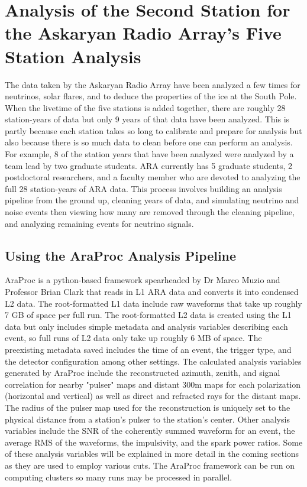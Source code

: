 \chapter{Analysis of the Second Station for the Askaryan Radio Array's Five Station Analysis}

  The data taken by the Askaryan Radio Array have been analyzed a few times for neutrinos, solar flares, and to deduce the properties of the ice at the South Pole. 
  When the livetime of the five stations is added together, there are roughly 28 station-years of data but only 9 years of that data have been analyzed.
  This is partly because each station takes so long to calibrate and prepare for analysis but also because there is so much data to clean before one can perform an analysis. 
  For example, 8 of the station years that have been analyzed were analyzed by a team lead by two graduate students. 
  ARA currently has 5 graduate students, 2 postdoctoral researchers, and a faculty member who are devoted to analyzing the full 28 station-years of ARA data. 
  This process involves building an analysis pipeline from the ground up, cleaning years of data, and simulating neutrino and noise events then viewing how many are removed through the cleaning pipeline, and analyzing remaining events for neutrino signals. 
  
\section{Using the AraProc Analysis Pipeline}

  AraProc is a python-based framework spearheaded by Dr Marco Muzio and Professor Brian Clark that reads in L1 ARA data and converts it into condensed L2 data. %
  The root-formatted L1 data include raw waveforms that take up roughly 7 GB of space per full run. 
  The root-formatted L2 data is created using the L1 data but only includes simple metadata and analysis variables describing each event, so full runs of L2 data only take up roughly 6 MB of space. 
  The preexisting metadata saved includes the time of an event, the trigger type, and the detector configuration among other settings. 
  The calculated analysis variables generated by AraProc include the reconstructed azimuth, zenith, and signal correlation for nearby "pulser" maps and distant 300m maps for each polarization (horizontal and vertical) as well as direct and refracted rays for the distant maps. 
  The radius of the pulser map used for the reconstruction is uniquely set to the physical distance from a station's pulser to the station's center.
  Other analysis variables include the SNR of the coherently summed waveform for an event, the average RMS of the waveforms, the impulsivity, and the spark power ratios. 
  Some of these analysis variables will be explained in more detail in the coming sections as they are used to employ various cuts. 
  The AraProc framework can be run on computing clusters so many runs may be processed in parallel. 
  
